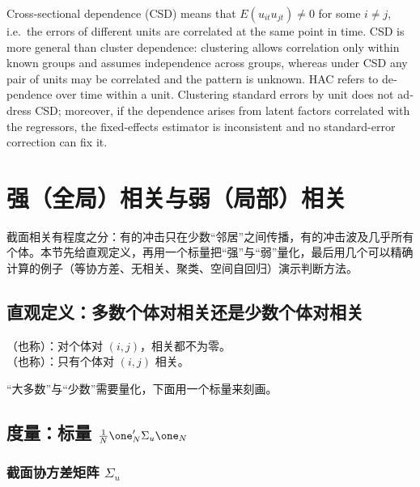 \begin{english}
Cross-sectional dependence (CSD) means that $E(u_{it}u_{jt})\neq0$ for some $i\neq j$, i.e.\ the errors of different units are correlated at the same point in time. CSD is more general than cluster dependence: clustering allows correlation only within known groups and assumes independence across groups, whereas under CSD any pair of units may be correlated and the pattern is unknown. HAC refers to dependence over time within a unit. Clustering standard errors by unit does not address CSD; moreover, if the dependence arises from latent factors correlated with the regressors, the fixed-effects estimator is inconsistent and no standard-error correction can fix it.
\end{english}

\section{强（全局）相关与弱（局部）相关}\label{sec:U13a-sw}

截面相关有程度之分：有的冲击只在少数“邻居”之间传播，有的冲击波及几乎所有个体。本节先给直观定义，再用一个标量把“强”与“弱”量化，最后用几个可以精确计算的例子（等协方差、无相关、聚类、空间自回归）演示判断方法。

\subsection{直观定义：多数个体对相关还是少数个体对相关}

\begin{defn}\label{def:U13a-sw-intuitive}
（也称）：对个体对 $(i,j)$，相关都不为零。\\
（也称）：只有个体对 $(i,j)$ 相关。
\end{defn}

“大多数”与“少数”需要量化，下面用一个标量来刻画。

\subsection{度量：标量 \texorpdfstring{$\frac1N\one_N'\Sigma_u\one_N$}{(1/N) 1'Sigma\_u 1}}

\subsubsection{截面协方差矩阵 \texorpdfstring{$\Sigma_u$}{Sigma\_u}}

